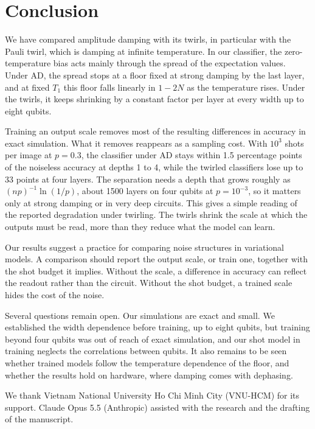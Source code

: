 \documentclass[
 aps,pra,
 twocolumn,
 superscriptaddress,
 longbibliography,
 nofootinbib
]{revtex4-2}
\begin{document}
\section{Conclusion}
\label{sec:conclusion}

We have compared amplitude damping with its twirls, in particular with the
Pauli twirl, which is damping at infinite temperature. In our classifier, the
zero-temperature bias acts mainly through the spread of the expectation values.
Under AD, the spread stops at a floor fixed at strong damping by the last layer,
and at fixed $T_1$ this floor falls linearly in $1-2N$ as the temperature
rises. Under the twirls, it keeps shrinking by a constant factor per layer at
every width up to eight qubits.

Training an output scale removes most of the resulting differences in accuracy
in exact simulation. What it removes reappears as a sampling cost. With $10^3$
shots per image at $p=0.3$, the classifier under AD stays within 1.5 percentage
points of the noiseless accuracy at depths 1 to 4, while the twirled
classifiers lose up to 33 points at four layers. The separation needs a depth
that grows roughly as $(np)^{-1}\ln(1/p)$, about 1500 layers on four qubits at
$p=10^{-3}$, so it matters only at strong damping or in very deep circuits.
This gives a simple reading of the reported degradation under
twirling. The twirls shrink the scale at which the outputs must be read, more
than they reduce what the model can learn.

Our results suggest a practice for comparing noise structures in variational
models. A comparison should report the output scale, or train one, together
with the shot budget it implies. Without the scale, a difference in accuracy
can reflect the readout rather than the circuit. Without the shot budget, a
trained scale hides the cost of the noise.

Several questions remain open. Our simulations are exact and small. We
established the width dependence before training, up to eight qubits, but
training beyond four qubits was out of reach of exact simulation, and our shot
model in training neglects the correlations between qubits. It also remains
to be seen whether trained models follow the temperature dependence of the
floor, and whether the results hold on hardware, where damping comes with
dephasing.

\begin{acknowledgments}

We thank Vietnam National University Ho Chi Minh City (VNU-HCM) for its support.
Claude Opus 5.5 (Anthropic) assisted with the research and the drafting of the
manuscript.

\end{acknowledgments}
\end{document}

